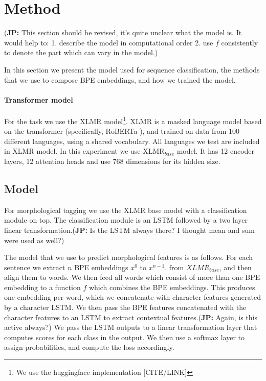 \documentclass[11pt]{article}
\newcommand\jp[1]{(\textbf{JP:} #1)}
\begin{document}
	\section{Method}
	\label{method}
        \jp{This section should be revised, it's quite unclear what
          the model is. It would help to: 1. describe the model in
          computational order 2. use $f$ consistently to denote the
          part which can vary in the model.}
        
	In this section we present the model used for sequence
        classification, the methods that we use to compose BPE
        embeddings, and how we trained the model.
	
	\paragraph{Transformer model}
        	For the task we use the XLMR
     \cite{conneau2019unsupervised} model\footnote{We use the
     huggingface implementation [CITE/LINK]}. XLMR is a masked
     language model based on the transformer (specifically, RoBERTa
     \cite{liu2019roberta}), and trained on data from 100 different
     languages, using a shared vocabulary. All languages we test are
     included in XLMR model. In this experiment we use
     \textsc{XLMR}$_{base}$ model. It has 12 encoder layers, 12
      attention heads and use 768 dimensions for its hidden size.
	
	\subsection{Model}
	For morphological tagging we use the XLMR base model with a
        classification module on top. The classification module is an
        LSTM followed by a two layer linear transformation.\jp{Is the
          LSTM always there? I thought mean and sum were used as
          well?}
	
	The model that we use to predict morphological features is as
        follows. For each sentence we extract $n$ BPE embeddings $x^0$
        to $x^{n-1}$. from $XLMR_{base}$, and then align them to
        words.  We then feed all words which consist of more than one
        BPE embedding to a function $f$ which combines the BPE
        embeddings. This produces one embedding per word, which we
        concatenate with character features generated by a character
        LSTM. We then pass the BPE features concatenated with the
        character features to an LSTM to extract contextual
        features.\jp{Again, is this active always?}  We pass the LSTM
        outputs to a linear transformation layer that computes scores
        for each class in the output. We then use a softmax layer to
        assign probabilities, and compute the loss accordingly.
	
\end{document}

